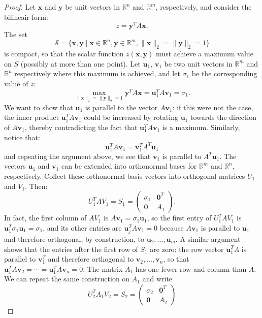 \documentclass[a4paper,11pt]{report}
\newcommand{\R}{{\mathbb R}}
\begin{document}
\begin{proof}
  Let $\mathbf{x}$ and $\mathbf{y}$ be unit vectors in $\R^n$ and $\R^m$, 
  respectively, and consider the bilineair form:
  $$z = \mathbf{y}^T A \mathbf{x}.$$
  The set 
  $$\mathcal{S} = \{\mathbf{x}, \mathbf{y} \mid \mathbf{x} \in \R^n, \mathbf{y} \in \R^m, \|\mathbf{x}\|_2 = \|\mathbf{y}\|_2 = 1\}$$
  is compact, so that the scalar function $z(\mathbf{x},\mathbf{y})$ must 
  achieve a maximum value on $S$ (possibly at more than one point). Let 
  $\mathbf{u}_1$, $\mathbf{v}_1$ be two unit vectors in $\R^m$ and $\R^n$ 
  respectively where this maximum is achieved, and let $\sigma_1$ be the 
  corresponding value of $z$:
  $$\max_{\|\mathbf{x}\|_2 = \|\mathbf{y}\|_2 = 1} \mathbf{y}^T A \mathbf{x} = 
  \mathbf{u}_1^T A \mathbf{v}_1 = \sigma_1.$$
  We want to show that $\mathbf{u}_1$ is parallel to the vector $A\mathbf{v}_1$: 
  if this were not the case, the inner product  $\mathbf{u}_1^T A \mathbf{v}_1$ 
  could be increased by rotating $\mathbf{u}_1$ towards the direction of 
  $A\mathbf{v}_1$, thereby contradicting the fact that 
  $\mathbf{u}_1^TA\mathbf{v}_1$ is a maximum. Similarly, notice that:
  $$\mathbf{u}_1^T A \mathbf{v}_1 = \mathbf{v}_1^T A^T \mathbf{u}_1$$
  and repeating the argument above, we see that $\mathbf{v}_1$ is parallel to 
  $A^T\mathbf{u}_1$.
  The vectors $\mathbf{u}_1$ and $\mathbf{v}_1$ can be extended into orthonormal 
  bases for $\R^m$ and $\R^n$, respectively. Collect these orthonormal basis 
  vectors into orthogonal matrices $U_1$ and $V_1$. Then:
  $$U_1^T AV_1 = S_1 = \begin{pmatrix}\sigma_1 & \mathbf{0}^T\\\mathbf{0}& A_1 
  \end{pmatrix}.$$
  In fact, the first column of $AV_1$ is $A\mathbf{v}_1 = \sigma_1 \mathbf{u}_1$, so the first entry of $U_1^T A V_1$ is 
  $\mathbf{u}_1^T \sigma_1 \mathbf{u}_1 = \sigma_1$, and its other entries are $\mathbf{u}_j^T A \mathbf{v}_1 = 0$ because
  $A\mathbf{v}_1$ is parallel to $\mathbf{u}_1$ and therefore orthogonal, by 
  construction, to $\mathbf{u}_2, \ldots, \mathbf{u}_m$. A similar argument 
  shows that the entries after the first row of $S_1$ are zero: the row vector $\mathbf{u}_1^TA$ 
  is parallel to $\mathbf{v}_1^T$ and therefore orthogonal to $\mathbf{v}_2, \ldots, 
  \mathbf{v}_n$, so that $\mathbf{u}_1^T A \mathbf{v}_2 = \cdots = \mathbf{u}_1^TA\mathbf{v}_n = 
  0$. The matrix $A_1$ has one fewer row and column than $A$. We can repeat the 
  same construction on $A_1$ and write
  $$U_2^T A_1 V_2 = S_2 = \begin{pmatrix}\sigma_2 & \mathbf{0}^T\\ \mathbf{0} & A_2\end{pmatrix}$$

\end{proof}
\end{document}
